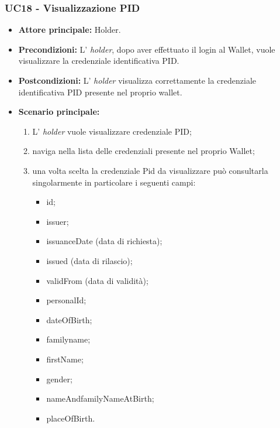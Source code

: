 \subsubsection{UC18 - Visualizzazione PID}
\begin{itemize}
\item \textbf{Attore principale:} Holder.
\item \textbf{Precondizioni:} L’ \textit{holder}, dopo aver effettuato il login al Wallet, vuole visualizzare la credenziale identificativa PID.
\item \textbf{Postcondizioni:} L’ \textit{holder} visualizza correttamente la credenziale identificativa PID presente nel proprio wallet.
\item \textbf{Scenario principale:} 
    \begin{enumerate}
        \item L' \textit{holder} vuole visualizzare credenziale PID; 
        \item naviga nella lista delle credenziali presente nel proprio Wallet;
        \item una volta scelta la credenziale Pid da visualizzare può consultarla singolarmente in particolare i seguenti campi:
        \begin{itemize}
            \item id;
            \item issuer;
            \item issuanceDate (data di richiesta);
            \item issued (data di rilascio);
            \item validFrom (data di validità);
            \item personalId;
            \item dateOfBirth;
            \item familyname;
            \item firstName;
            \item gender;
            \item nameAndfamilyNameAtBirth;
            \item placeOfBirth.
        \end{itemize}
    \end{enumerate}
\end{itemize}

